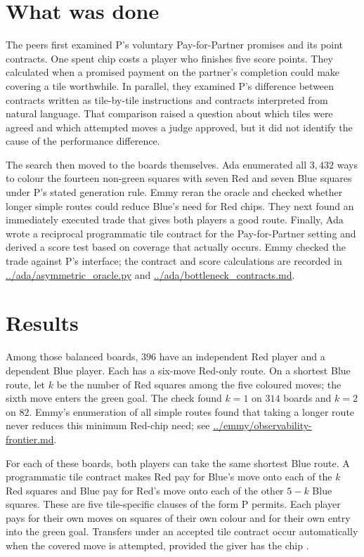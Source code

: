 \documentclass{article}
\begin{document}
\section{What was done}

The peers first examined P's voluntary Pay-for-Partner promises and its point contracts. One spent
chip costs a player who finishes five score points. They calculated when a promised payment on the
partner's completion could make covering a tile worthwhile. In parallel, they examined P's
difference between contracts written as tile-by-tile instructions and contracts interpreted from
natural language. That comparison raised a question about which tiles were agreed and which
attempted moves a judge approved, but it did not identify the cause of the performance difference.

The search then moved to the boards themselves. Ada enumerated all \(3{,}432\) ways to colour the
fourteen non-green squares with seven Red and seven Blue squares under P's stated generation rule.
Emmy reran the oracle and checked whether longer simple routes could reduce Blue's need for Red
chips. They next found an immediately executed trade that gives both players a good route. Finally,
Ada wrote a reciprocal programmatic tile contract for the Pay-for-Partner setting and derived a
score test based on coverage that actually occurs. Emmy checked the trade against P's interface; the
contract and score calculations are recorded in \url{../ada/asymmetric_oracle.py} and
\url{../ada/bottleneck_contracts.md}.

\section{Results}

Among those balanced boards, \(396\) have an independent Red player and a dependent Blue player.
Each has a six-move Red-only route. On a shortest Blue route, let \(k\) be the number of Red squares
among the five coloured moves; the sixth move enters the green goal. The check found \(k=1\) on
\(314\) boards and \(k=2\) on \(82\). Emmy's enumeration of all simple routes found that taking a
longer route never reduces this minimum Red-chip need; see \url{../emmy/observability-frontier.md}.

For each of these boards, both players can take the same shortest Blue route. A programmatic tile
contract makes Red pay for Blue's move onto each of the \(k\) Red squares and Blue pay for Red's
move onto each of the other \(5-k\) Blue squares. These are five tile-specific clauses of the form P
permits. Each player pays for their own moves on squares of their own colour and for their own entry
into the green goal. Transfers under an accepted tile contract occur automatically when the covered
move is attempted, provided the giver has the chip \cite{P}.
\end{document}
